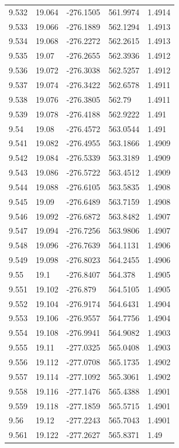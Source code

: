 \begin{tabular}{lllll}
9.532 & 19.064 & -276.1505 & 561.9974 & 1.4914 \\
9.533 & 19.066 & -276.1889 & 562.1294 & 1.4913 \\
9.534 & 19.068 & -276.2272 & 562.2615 & 1.4913 \\
9.535 & 19.07 & -276.2655 & 562.3936 & 1.4912 \\
9.536 & 19.072 & -276.3038 & 562.5257 & 1.4912 \\
9.537 & 19.074 & -276.3422 & 562.6578 & 1.4911 \\
9.538 & 19.076 & -276.3805 & 562.79 & 1.4911 \\
9.539 & 19.078 & -276.4188 & 562.9222 & 1.491 \\
9.54 & 19.08 & -276.4572 & 563.0544 & 1.491 \\
9.541 & 19.082 & -276.4955 & 563.1866 & 1.4909 \\
9.542 & 19.084 & -276.5339 & 563.3189 & 1.4909 \\
9.543 & 19.086 & -276.5722 & 563.4512 & 1.4909 \\
9.544 & 19.088 & -276.6105 & 563.5835 & 1.4908 \\
9.545 & 19.09 & -276.6489 & 563.7159 & 1.4908 \\
9.546 & 19.092 & -276.6872 & 563.8482 & 1.4907 \\
9.547 & 19.094 & -276.7256 & 563.9806 & 1.4907 \\
9.548 & 19.096 & -276.7639 & 564.1131 & 1.4906 \\
9.549 & 19.098 & -276.8023 & 564.2455 & 1.4906 \\
9.55 & 19.1 & -276.8407 & 564.378 & 1.4905 \\
9.551 & 19.102 & -276.879 & 564.5105 & 1.4905 \\
9.552 & 19.104 & -276.9174 & 564.6431 & 1.4904 \\
9.553 & 19.106 & -276.9557 & 564.7756 & 1.4904 \\
9.554 & 19.108 & -276.9941 & 564.9082 & 1.4903 \\
9.555 & 19.11 & -277.0325 & 565.0408 & 1.4903 \\
9.556 & 19.112 & -277.0708 & 565.1735 & 1.4902 \\
9.557 & 19.114 & -277.1092 & 565.3061 & 1.4902 \\
9.558 & 19.116 & -277.1476 & 565.4388 & 1.4901 \\
9.559 & 19.118 & -277.1859 & 565.5715 & 1.4901 \\
9.56 & 19.12 & -277.2243 & 565.7043 & 1.4901 \\
9.561 & 19.122 & -277.2627 & 565.8371 & 1.49 \\

\end{tabular}
